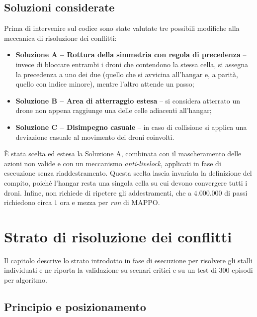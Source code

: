 \documentclass[12pt,a4paper,twoside]{report}
\begin{document}
\section{Soluzioni considerate}
\label{sec:soluzioni_considerate}

Prima di intervenire sul codice sono state valutate tre possibili modifiche alla meccanica di risoluzione dei conflitti:
\begin{itemize}
    \item \textbf{Soluzione A -- Rottura della simmetria con regola di precedenza} -- invece di bloccare entrambi i droni che contendono la stessa cella, si assegna la precedenza a uno dei due (quello che si avvicina all'hangar e, a parità, quello con indice minore), mentre l'altro attende un passo;
    \item \textbf{Soluzione B -- Area di atterraggio estesa} -- si considera atterrato un drone non appena raggiunge una delle celle adiacenti all'hangar;
    \item \textbf{Soluzione C -- Disimpegno casuale} -- in caso di collisione si applica una deviazione casuale al movimento dei droni coinvolti.
\end{itemize}

È stata scelta ed estesa la Soluzione A, combinata con il mascheramento delle azioni non valide e con un meccanismo \emph{anti-livelock}, applicati in fase di esecuzione senza riaddestramento. Questa scelta lascia invariata la definizione del compito, poiché l'hangar resta una singola cella su cui devono convergere tutti i droni. Infine, non richiede di ripetere gli addestramenti, che a $4.000.000$ di passi richiedono circa $1$ ora e mezza per \emph{run} di MAPPO.

\chapter{Strato di risoluzione dei conflitti}
\label{chap:strato_risoluzione}

Il capitolo descrive lo strato introdotto in fase di esecuzione per risolvere gli stalli individuati e ne riporta la validazione su scenari critici e su un test di $300$ episodi per algoritmo.

\section{Principio e posizionamento}
\label{sec:principio_posizionamento}
\end{document}
